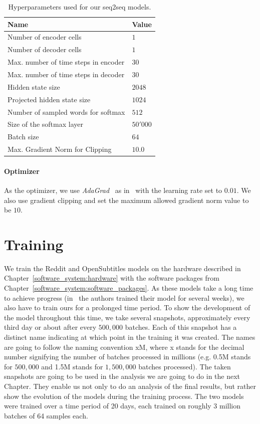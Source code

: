 \begin{table}[H]
	\centering
	\begin{adjustbox}{max width=\textwidth}
		\begin{tabular}{ll}
			\toprule
			Name & Value\\ \midrule
			Number of encoder cells & $1$\\
			Number of decoder cells & $1$\\
			Max. number of time steps in encoder & $30$\\
			Max. number of time steps in decoder & $30$\\
			Hidden state size & $2048$\\
			Projected hidden state size & $1024$\\
			Number of sampled words for softmax & $512$\\
			Size of the softmax layer & $50'000$\\
			Batch size & $64$\\
			Max. Gradient Norm for Clipping & $10.0$\\
			\bottomrule
		\end{tabular}
	\end{adjustbox}
	\caption{Hyperparameters used for our seq2seq models.}
	\label{methods:hyperparameters:table}
\end{table}

\paragraph{Optimizer} As the optimizer, we use \emph{AdaGrad}~\cite{Duchi:2011} as in~\cite{Vinyals:2015} with the learning rate set to $0.01$. We also use gradient clipping \cite{Pascanu:2013} and set the maximum allowed gradient norm value to be $10$.

\section{Training}
\label{methods:training}
We train the Reddit and OpenSubtitles models on the hardware described in Chapter~\ref{software_system:hardware} with the software packages from Chapter~\ref{software_system:software_packages}. As these models take a long time to achieve progress (in~\cite{Vinyals:2015} the authors trained their model for several weeks), we also have to train ours for a prolonged time period. To show the development of the model throughout this time, we take several snapshots, approximately every third day or about after every $500,000$ batches. Each of this snapshot has a distinct name indicating at which point in the training it was created. The names are going to follow the naming convention xM, where x stands for the decimal number signifying the number of batches processed in millions (e.g. 0.5M stands for $500,000$ and 1.5M stands for $1,500,000$ batches processed). The taken snapshots are going to be used in the analysis we are going to do in the next Chapter. They enable us not only to do an analysis of the final results, but rather show the evolution of the models during the training process. The two models were trained over a time period of 20 days, each trained on roughly 3 million batches of 64 samples each.

